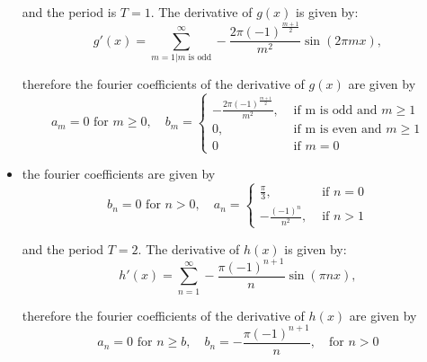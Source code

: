 \documentclass[11pt]{article}
\begin{document}
\begin{solution}
\begin{itemize}
    and the period is $T = 1$. The derivative of $g(x)$ is given by:
    $$
    g'(x) = \sum_{m=1|m \text{ is odd}}^{\infty} -\frac{2\pi (-1)^{\frac{m+1}{2}}}{m^2}\sin(2\pi m x),
    $$

    therefore the fourier coefficients of the derivative of $g(x)$ are given by 
    $$
    a_m = 0 \text{ for } m \geq 0, \quad b_m = \begin{cases}-\frac{2\pi (-1)^{\frac{m+1}{2}}}{m^2}, & \text { if m is odd and }m \geq 1 \\ 0, & \text{ if m is even and } m \geq 1\\ 0 & \text{ if } m = 0  \end{cases} 
    $$
    \item 
    the fourier coefficients are given by 
    $$
    b_n = 0 \text{ for } n >0, \quad a_n = \begin{cases}\frac{\pi}{3}, & \text { if }n = 0 \\ -\frac{(-1)^n}{n^2}, & \text{ if } n > 1 \end{cases} 
    $$

    and the period $T = 2$. The derivative of $h(x)$ is given by:
    $$
    h'(x) =\sum_{n=1}^{\infty} -\frac{\pi(-1)^{n+1}}{n}\sin(\pi n x),
    $$

    therefore the fourier coefficients of the derivative of $h(x)$ are given by 
    $$
    a_n = 0 \text{ for } n \geq b, \quad b_n = -\frac{\pi(-1)^{n+1}}{n},\quad \text{for }n > 0
    $$
    \end{itemize}
\end{solution}
\end{document}
